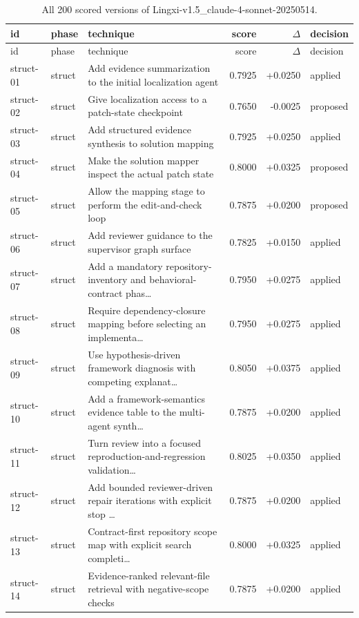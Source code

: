 \begin{center}\scriptsize\begin{longtable}{llp{5.2cm}rrl}
\caption{All 200 scored versions of Lingxi-v1.5\_claude-4-sonnet-20250514.}\\
\toprule id & phase & technique & score & $\Delta$ & decision \\ \midrule \endfirsthead
\toprule id & phase & technique & score & $\Delta$ & decision \\ \midrule \endhead
struct-01 & struct & Add evidence summarization to the initial localization agent & 0.7925 & +0.0250 & applied \\
struct-02 & struct & Give localization access to a patch-state checkpoint & 0.7650 & -0.0025 & proposed \\
struct-03 & struct & Add structured evidence synthesis to solution mapping & 0.7925 & +0.0250 & applied \\
struct-04 & struct & Make the solution mapper inspect the actual patch state & 0.8000 & +0.0325 & proposed \\
struct-05 & struct & Allow the mapping stage to perform the edit-and-check loop & 0.7875 & +0.0200 & proposed \\
struct-06 & struct & Add reviewer guidance to the supervisor graph surface & 0.7825 & +0.0150 & applied \\
struct-07 & struct & Add a mandatory repository-inventory and behavioral-contract phas\ldots{} & 0.7950 & +0.0275 & applied \\
struct-08 & struct & Require dependency-closure mapping before selecting an implementa\ldots{} & 0.7950 & +0.0275 & applied \\
struct-09 & struct & Use hypothesis-driven framework diagnosis with competing explanat\ldots{} & 0.8050 & +0.0375 & applied \\
struct-10 & struct & Add a framework-semantics evidence table to the multi-agent synth\ldots{} & 0.7875 & +0.0200 & applied \\
struct-11 & struct & Turn review into a focused reproduction-and-regression validation\ldots{} & 0.8025 & +0.0350 & applied \\
struct-12 & struct & Add bounded reviewer-driven repair iterations with explicit stop \ldots{} & 0.7875 & +0.0200 & applied \\
struct-13 & struct & Contract-first repository scope map with explicit search completi\ldots{} & 0.8000 & +0.0325 & applied \\
struct-14 & struct & Evidence-ranked relevant-file retrieval with negative-scope checks & 0.7875 & +0.0200 & applied \\

\end{longtable}
\end{center}
